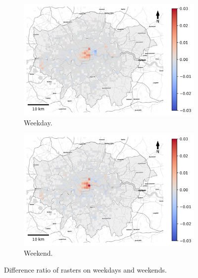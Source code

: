 \documentclass{article}
\theoremstyle{remark}
\begin{document}
\begin{figure}[!h]

\begin{subfigure}{0.5\textwidth}
\includegraphics[width=1\linewidth]{figures/raster_diff_weekday.png} 
\caption{Weekday.}
\label{fig:raster_diff_weekday}
\end{subfigure}
\begin{subfigure}{0.5\textwidth}
\includegraphics[width=1\linewidth]{figures/raster_diff_weekend.png}
\caption{Weekend.}
\label{fig:raster_diff_weekend}
\end{subfigure}

\caption{Difference ratio of rasters on weekdays and weekends.} \label{fig:raster_diff_week}
\end{figure}
\end{document}
